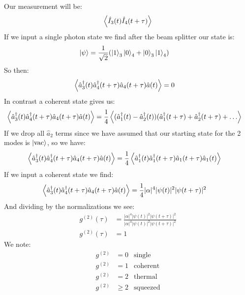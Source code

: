 Our measurement will be:
\begin{align*}
	\expval{\hat{I}_3(t) \hat{I}_4(t+\tau)}
\end{align*}
If we input a single photon state we find after the beam splitter our state is:
\begin{align*}
	\ket{\psi} &= \frac{1}{\sqrt{2}}(\ket{1}_3\ket{0}_4 + \ket{0}_3\ket{1}_4)
\end{align*}
So then:
\begin{align*}
	\expval{\hat{a}_3^\dagger(t)\hat{a}^\dagger_4(t+\tau)\hat{a}_4(t+\tau)\hat{a}(t)} &= 0
\end{align*}
In contrast a coherent state gives us:
\begin{align*}
	\expval{\hat{a}_3^\dagger(t)\hat{a}^\dagger_4(t+\tau)\hat{a}_4(t+\tau)\hat{a}(t)} &= \frac{1}{4} \expval{(\hat{a}_1^\dagger(t) - \hat{a}_2^\dagger(t))(\hat{a}^\dagger_1(t+\tau) +\hat{a}^\dagger_2(t+\tau) +\ldots}
\end{align*}
If we drop all $\hat{a}_2$ terms since we have assumed that our starting state for the 2 modes is $\ket{\text{vac}}$, so we have:
\begin{align*}
	\expval{\hat{a}_3^\dagger(t)\hat{a}^\dagger_4(t+\tau)\hat{a}_4(t+\tau)\hat{a}(t)} &= \frac{1}{4} \expval{\hat{a}_1^\dagger(t)\hat{a}^\dagger_1(t+\tau)\hat{a}_1(t+\tau)\hat{a}_1(t)}
\end{align*}
If we input a coherent state we find:
\begin{align*}
	\expval{\hat{a}_3^\dagger(t)\hat{a}^\dagger_4(t+\tau)\hat{a}_4(t+\tau)\hat{a}(t)} &= \frac{1}{4} |\alpha|^4 |\psi(t)|^2|\psi(t+\tau)|^2
\end{align*}
And dividing by the normalizations we see:
\begin{align*}
	g^{(2)}(\tau) &= \frac{|\alpha|^4 |\psi(t)|^2|\psi(t+\tau)|^2}{|\alpha|^4 |\psi(t)|^2|\psi(t+\tau)|^2} \\
	g^{(2)}(\tau) &= 1
\end{align*}
We note:
\begin{align*}
	g^{(2)} &= 0 & \text{single} \\
	g^{(2)} &= 1 & \text{coherent} \\
	g^{(2)} &= 2 & \text{thermal} \\
	g^{(2)} &\geq 2 & \text{squeezed}
\end{align*}
